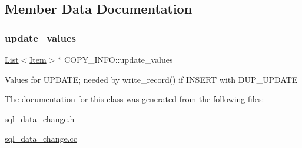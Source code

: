 \subsection{Member Data Documentation}
\mbox{\label{classCOPY__INFO_a451057d07720b1c973ac2881c8939406}} 
\subsubsection{\texorpdfstring{update\+\_\+values}{update\_values}}
{\footnotesize\ttfamily \mbox{\hyperlink{classList}{List}}$<$\mbox{\hyperlink{classItem}{Item}}$>$$\ast$ C\+O\+P\+Y\+\_\+\+I\+N\+F\+O\+::update\+\_\+values}

Values for U\+P\+D\+A\+TE; needed by write\+\_\+record() if I\+N\+S\+E\+RT with D\+U\+P\+\_\+\+U\+P\+D\+A\+TE 

The documentation for this class was generated from the following files\+:\begin{DoxyCompactItemize}
\item 
\mbox{\hyperlink{sql__data__change_8h}{sql\+\_\+data\+\_\+change.\+h}}\item 
\mbox{\hyperlink{sql__data__change_8cc}{sql\+\_\+data\+\_\+change.\+cc}}\end{DoxyCompactItemize}
